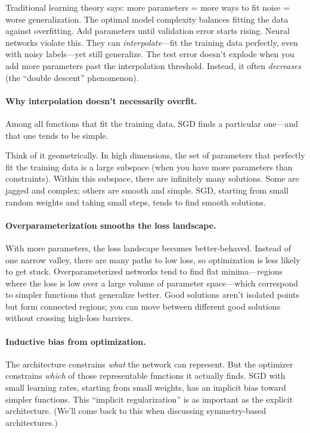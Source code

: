 \documentclass[11pt]{article}
\begin{document}
Traditional learning theory says: more parameters = more ways to fit noise = worse generalization. The optimal model complexity balances fitting the data against overfitting. Add parameters until validation error starts rising.
%
Neural networks violate this. They can \emph{interpolate}---fit the training data perfectly, even with noisy labels---yet still generalize. The test error doesn't explode when you add more parameters past the interpolation threshold. Instead, it often \emph{decreases} (the ``double descent'' phenomenon).

\paragraph{Why interpolation doesn't necessarily overfit.} Among all functions that fit the training data, SGD finds a particular one---and that one tends to be simple.

Think of it geometrically. In high dimensions, the set of parameters that perfectly fit the training data is a large subspace (when you have more parameters than constraints). Within this subspace, there are infinitely many solutions. Some are jagged and complex; others are smooth and simple. SGD, starting from small random weights and taking small steps, tends to find smooth solutions.

\paragraph{Overparameterization smooths the loss landscape.} With more parameters, the loss landscape becomes better-behaved. Instead of one narrow valley, there are many paths to low loss, so optimization is less likely to get stuck. Overparameterized networks tend to find flat minima---regions where the loss is low over a large volume of parameter space---which correspond to simpler functions that generalize better. Good solutions aren't isolated points but form connected regions; you can move between different good solutions without crossing high-loss barriers.

\paragraph{Inductive bias from optimization.} The architecture constrains \emph{what} the network can represent. But the optimizer constrains \emph{which} of those representable functions it actually finds. SGD with small learning rates, starting from small weights, has an implicit bias toward simpler functions. This ``implicit regularization'' is as important as the explicit architecture. (We'll come back to this when discussing symmetry-based architectures.)
\end{document}
